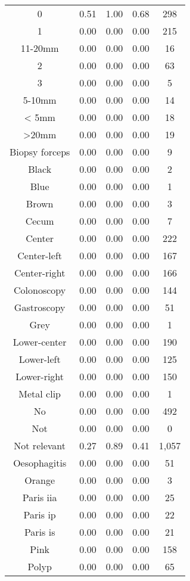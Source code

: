 \begin{center}
\begin{longtable}{|c|c|c|c|c|}
0 &  0.51 & 1.00 & 0.68 &  298\\
1 &  0.00 & 0.00 & 0.00 &  215\\
11-20mm &  0.00 & 0.00 & 0.00 &   16\\
2 &  0.00 & 0.00 & 0.00 &   63\\
3 &  0.00 & 0.00 & 0.00 &    5\\
5-10mm &  0.00 & 0.00 & 0.00 &   14\\
< 5mm &  0.00 & 0.00 & 0.00 &   18\\
>20mm &  0.00 & 0.00 & 0.00 &   19\\
Biopsy forceps &  0.00 & 0.00 & 0.00 &    9\\
Black &  0.00 & 0.00 & 0.00 &    2\\
Blue &  0.00 & 0.00 & 0.00 &    1\\
Brown &  0.00 & 0.00 & 0.00 &    3\\
Cecum &  0.00 & 0.00 & 0.00 &    7\\
Center &  0.00 & 0.00 & 0.00 &  222\\
Center-left &  0.00 & 0.00 & 0.00 &  167\\
Center-right &  0.00 & 0.00 & 0.00 &  166\\
Colonoscopy &  0.00 & 0.00 & 0.00 &  144\\
Gastroscopy &  0.00 & 0.00 & 0.00 &   51\\
Grey &  0.00 & 0.00 & 0.00 &    1\\
Lower-center &  0.00 & 0.00 & 0.00 &  190\\
Lower-left &  0.00 & 0.00 & 0.00 &  125\\
Lower-right &  0.00 & 0.00 & 0.00 &  150\\
Metal clip &  0.00 & 0.00 & 0.00 &    1\\
No &  0.00 & 0.00 & 0.00 &  492\\
Not &  0.00 & 0.00 & 0.00 &    0\\
Not relevant &  0.27 & 0.89 & 0.41 & 1,057\\
Oesophagitis &  0.00 & 0.00 & 0.00 &   51\\
Orange &  0.00 & 0.00 & 0.00 &    3\\
Paris iia &  0.00 & 0.00 & 0.00 &   25\\
Paris ip &  0.00 & 0.00 & 0.00 &   22\\
Paris is &  0.00 & 0.00 & 0.00 &   21\\
Pink &  0.00 & 0.00 & 0.00 &  158\\
Polyp &  0.00 & 0.00 & 0.00 &   65\\

\end{longtable}
\end{center}
